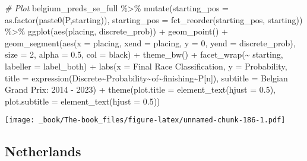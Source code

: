 \documentclass[
]{book}
\newenvironment{Shaded}{\begin{snugshade}}{\end{snugshade}}
\newcommand{\AttributeTok}[1]{\textcolor[rgb]{0.77,0.63,0.00}{#1}}
\newcommand{\CommentTok}[1]{\textcolor[rgb]{0.56,0.35,0.01}{\textit{#1}}}
\newcommand{\DecValTok}[1]{\textcolor[rgb]{0.00,0.00,0.81}{#1}}
\newcommand{\FloatTok}[1]{\textcolor[rgb]{0.00,0.00,0.81}{#1}}
\newcommand{\FunctionTok}[1]{\textcolor[rgb]{0.00,0.00,0.00}{#1}}
\newcommand{\NormalTok}[1]{#1}
\newcommand{\SpecialCharTok}[1]{\textcolor[rgb]{0.00,0.00,0.00}{#1}}
\newcommand{\StringTok}[1]{\textcolor[rgb]{0.31,0.60,0.02}{#1}}
\begin{document}
\begin{Shaded}
\begin{Highlighting}[]
\CommentTok{\# Plot}
\NormalTok{belgium\_preds\_se\_full }\SpecialCharTok{\%\textgreater{}\%}
  \FunctionTok{mutate}\NormalTok{(}\AttributeTok{starting\_pos =} \FunctionTok{as.factor}\NormalTok{(}\FunctionTok{paste0}\NormalTok{(}\StringTok{\textquotesingle{}P\textquotesingle{}}\NormalTok{,starting)),}
         \AttributeTok{starting\_pos =} \FunctionTok{fct\_reorder}\NormalTok{(starting\_pos, starting)) }\SpecialCharTok{\%\textgreater{}\%}
  \FunctionTok{ggplot}\NormalTok{(}\FunctionTok{aes}\NormalTok{(placing, discrete\_prob)) }\SpecialCharTok{+}
  \FunctionTok{geom\_point}\NormalTok{() }\SpecialCharTok{+}
  \FunctionTok{geom\_segment}\NormalTok{(}\FunctionTok{aes}\NormalTok{(}\AttributeTok{x =}\NormalTok{ placing, }\AttributeTok{xend =}\NormalTok{ placing, }\AttributeTok{y =} \DecValTok{0}\NormalTok{, }\AttributeTok{yend =}\NormalTok{ discrete\_prob),}
               \AttributeTok{size =} \DecValTok{2}\NormalTok{, }\AttributeTok{alpha =} \FloatTok{0.5}\NormalTok{, }\AttributeTok{col =} \StringTok{\textquotesingle{}black\textquotesingle{}}\NormalTok{) }\SpecialCharTok{+}
  \FunctionTok{theme\_bw}\NormalTok{() }\SpecialCharTok{+}
  \FunctionTok{facet\_wrap}\NormalTok{(}\SpecialCharTok{\textasciitilde{}}\NormalTok{ starting, }\AttributeTok{labeller =}\NormalTok{ label\_both) }\SpecialCharTok{+}
  \FunctionTok{labs}\NormalTok{(}\AttributeTok{x =} \StringTok{\textquotesingle{}Final Race Classification\textquotesingle{}}\NormalTok{,}
       \AttributeTok{y =} \StringTok{\textquotesingle{}Probability\textquotesingle{}}\NormalTok{,}
       \AttributeTok{title =} \FunctionTok{expression}\NormalTok{(Discrete}\SpecialCharTok{\textasciitilde{}}\NormalTok{Probability}\SpecialCharTok{\textasciitilde{}}\NormalTok{of}\SpecialCharTok{\textasciitilde{}}\NormalTok{finishing}\SpecialCharTok{\textasciitilde{}}\NormalTok{P[n]),}
       \AttributeTok{subtitle =} \StringTok{\textquotesingle{}Belgian Grand Prix: 2014 {-} 2023\textquotesingle{}}\NormalTok{) }\SpecialCharTok{+}
  \FunctionTok{theme}\NormalTok{(}\AttributeTok{plot.title =} \FunctionTok{element\_text}\NormalTok{(}\AttributeTok{hjust =} \FloatTok{0.5}\NormalTok{),}
        \AttributeTok{plot.subtitle =} \FunctionTok{element\_text}\NormalTok{(}\AttributeTok{hjust =} \FloatTok{0.5}\NormalTok{)) }
\end{Highlighting}
\end{Shaded}

\texttt{[image: \_book/The-book\_files/figure-latex/unnamed-chunk-186-1.pdf]}

\hypertarget{netherlands}{%
\subsection{Netherlands}\label{netherlands}}
\end{document}
